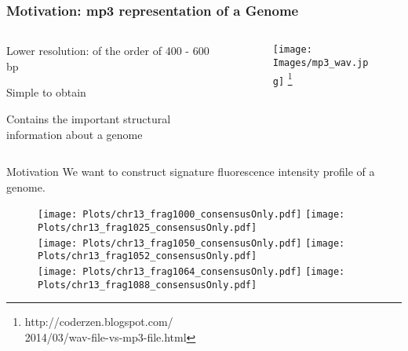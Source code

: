 \documentclass[10pt,dvipsnames,table]{beamer}
\begin{document}
\begin{frame}
\frametitle{Motivation: mp3 representation of a Genome}
\vspace{-0.8cm}
\begin{columns}[t]
\begin{column}{0.6\textwidth}
\begin{itemize} {\small{
\item Lower resolution: of the order of 400 - 600 bp
\item Simple to obtain
\item Contains the important structural information about a genome
}}
\end{itemize}
\end{column}

\begin{column}{0.4\textwidth}
\begin{figure}[t]
\texttt{[image: Images/mp3\_wav.jpg]} \footnote{\tiny{http://coderzen.blogspot.com/ \\ 2014/03/wav-file-vs-mp3-file.html}}
\end{figure}

\end{column}
\end{columns}
\begin{block}{Motivation}
We want to construct signature fluorescence intensity profile of a genome.
\end{block}

\vspace{-0.2cm}
\begin{figure}[H]
\texttt{[image: Plots/chr13\_frag1000\_consensusOnly.pdf]}
\hspace{0.5cm}
\texttt{[image: Plots/chr13\_frag1025\_consensusOnly.pdf]} \\
\texttt{[image: Plots/chr13\_frag1050\_consensusOnly.pdf]}
\hspace{0.5cm}
\texttt{[image: Plots/chr13\_frag1052\_consensusOnly.pdf]} \\
\texttt{[image: Plots/chr13\_frag1064\_consensusOnly.pdf]}
\hspace{0.5cm}
\texttt{[image: Plots/chr13\_frag1088\_consensusOnly.pdf]}
\end{figure}

\note{}
\end{frame}
\end{document}
